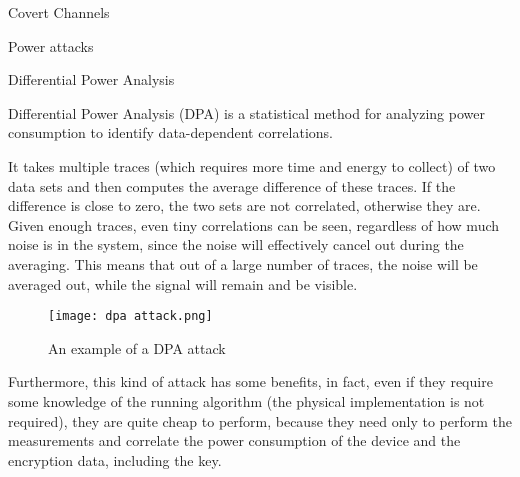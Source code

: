 \begin{section}{Covert Channels}
  \begin{subsection}{Power attacks}
    \begin{subsubsection}{Differential Power Analysis}
      \begin{boxH}
        Differential Power Analysis (DPA) is a statistical method for analyzing power consumption to
        identify data-dependent correlations.
      \end{boxH}
      It takes multiple traces (which requires more time and energy to collect) of two data sets and
      then computes the average difference of these traces. If the difference is close to zero, the
      two sets are not correlated, otherwise they are.\\
      Given enough traces, even tiny correlations can be seen, regardless of how much noise is in
      the system, since the noise will effectively cancel out during the averaging. This means that
      out of a large number of traces, the noise will be averaged out, while the signal will remain
      and be visible.

      \begin{figure}[h]
        \centering
        \texttt{[image: dpa attack.png]}
        \caption{An example of a DPA attack}
      \end{figure}
      Furthermore, this kind of attack has some benefits, in fact, even if they require some
      knowledge of the running algorithm (the physical implementation is not required), they are
      quite cheap to perform, because they need only to perform the measurements and correlate the
      power consumption of the device and the encryption data, including the key.\\
    \end{subsubsection}

  \end{subsection}

\end{section}

